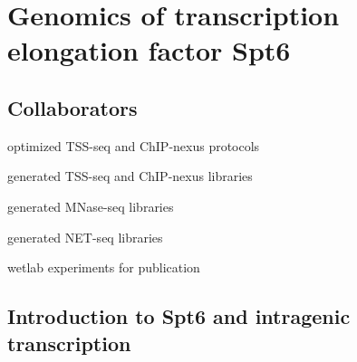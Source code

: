 \chapter{Genomics of transcription elongation factor Spt6}

\section{Collaborators}

\begin{description}[align=right, labelwidth=5cm, noitemsep]
    \item [Steve Doris] optimized TSS-seq and ChIP-nexus protocols
    \item [] generated TSS-seq and ChIP-nexus libraries
    \item [Olga Viktorovskaya] generated MNase-seq libraries
    \item [Magdalena Murawska] generated NET-seq libraries
    \item [Dan Spatt] wetlab experiments for publication
\end{description}

\section{Introduction to Spt6 and intragenic transcription}

